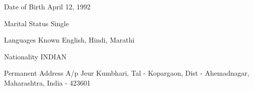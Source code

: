 

\begin{cvskills}

  \cvskill
    {Date of Birth} %
    {April 12, 1992} %

  \cvskill
    {Marital Status} %
    {Single} %
    
  \cvskill
    {Languages Known} %
    {English, Hindi, Marathi} %

  \cvskill
    {Nationality} %
    {INDIAN} %
    
  \cvskill
    {Permanent Address} %
    {A/p Jeur Kumbhari, Tal - Kopargaon, Dist - Ahemadnagar, Maharashtra, India - 423601} %
\end{cvskills}
